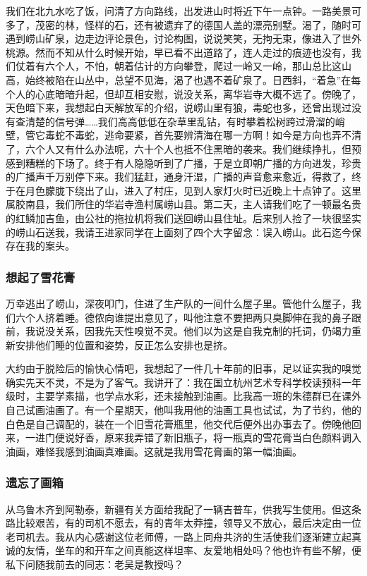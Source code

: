 \documentclass{article}
\begin{document}
我们在北九水吃了饭，问清了方向路线，出发进山时将近下午一点钟。一路美景可多了，茂密的林，怪样的石，还有被遗弃了的德国人盖的漂亮别墅。渴了，随时可遇到崂山矿泉，边走边评论景色，讨论构图，说说笑笑，无拘无束，像进入了世外桃源。然而不知从什么时候开始，早已看不出道路了，连人走过的痕迹也没有，我们仗着有六个人，不怕，朝着估计的方向攀登，爬过一岭又一岭，那山总比这山高，始终被陷在山丛中，总望不见海，渴了也遇不着矿泉了。日西斜，“着急”在每个人的心底暗暗升起，但却互相安慰，说没关系，离华岩寺大概不远了。傍晚了，天色暗下来，我想起白天解放军的介绍，说崂山里有狼，毒蛇也多，还曾出现过没有查清楚的信号弹……我们高高低低在杂草里乱钻，有时攀着松树跨过滑溜的峭壁，管它毒蛇不毒蛇，逃命要紧，首先要辨清海在哪一方啊！如今是方向也弄不清了，六个人又有什么办法呢，六十个人也抵不住黑暗的袭来。我们继续挣扎，但预感到糟糕的下场了。终于有人隐隐听到了广播，于是立即朝广播的方向进发，珍贵的广播声千万别停下来。我们猛赶，通身汗湿，广播的声音愈来愈近，得救了，终于在月色朦胧下绕出了山，进入了村庄，见到人家灯火时已近晚上十点钟了。这里属胶南县，我们所住的华岩寺渔村属崂山县。第二天，主人请我们吃了一顿最名贵的红鳞加吉鱼，由公社的拖拉机将我们送回崂山县住址。后来别人捡了一块很坚实的崂山石送我，我请王进家同学在上面刻了四个大字留念：误入崂山。此石迄今保存在我的案头。
\subsubsection{想起了雪花膏}
万幸逃出了崂山，深夜叩门，住进了生产队的一间什么屋子里。管他什么屋子，我们六个人挤着睡。德侬向谁提出意见了，叫他注意不要把两只臭脚伸在我的鼻子跟前，我说没关系，因我先天性嗅觉不灵。他们以为这是自我克制的托词，仍竭力重新安排他们睡的位置和姿势，反正怎么安排也是挤。

大约由于脱险后的愉快心情吧，我想起了一件几十年前的旧事，足以证实我的嗅觉确实先天不灵，不是为了客气。我讲开了：我在国立杭州艺术专科学校读预科一年级时，主要学素描，也学点水彩，还未接触到油画。比我高一班的朱德群已在课外自己试画油画了。有一个星期天，他叫我用他的油画工具也试试，为了节约，他的白色是自己调配的，装在一个旧雪花膏瓶里，他交代后便外出办事去了。傍晚他回来，一进门便说好香，原来我弄错了新旧瓶子，将一瓶真的雪花膏当白色颜料调入油画，难怪我感到油画真难画。这就是我用雪花膏画的第一幅油画。
\subsubsection{遗忘了画箱}
从乌鲁木齐到阿勒泰，新疆有关方面给我配了一辆吉普车，供我写生使用。但这条路比较艰苦，有的司机不愿去，有的青年太莽撞，领导又不放心，最后决定由一位老司机去。我从内心感谢这位老师傅，一路上同舟共济的生活使我们逐渐建立起真诚的友情，坐车的和开车之间真能这样坦率、友爱地相处吗？他也许有些不解，便私下问随我前去的同志：老吴是教授吗？
\end{document}
